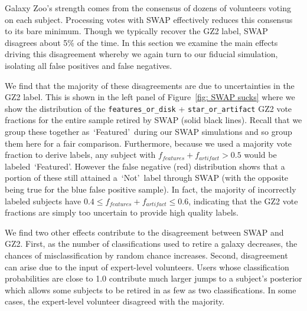 \documentclass[twocolumn]{aastex6}
\newcommand{\Pf}{$P_{F,0}$}
\newcommand{\Pn}{$P_{N,0}$}
\newcommand{\feat}{`Featured'}
\newcommand{\notfeat}{`Not'}
\newcommand{\raw}{GZ2$_{\text{raw}}$}
\begin{document}
Galaxy Zoo's strength comes from the consensus of dozens of volunteers voting on each subject. 
Processing votes with SWAP effectively reduces this consensus to its bare minimum. 
Though we typically recover the GZ2 label, SWAP disagrees about 5\% of the time. 
In this section we examine the main effects driving this disagreement whereby we again
 turn to our fiducial simulation, isolating all false positives and false negatives. 

We find that the majority of these disagreements are due to uncertainties in the GZ2
label. This is shown in the left panel of Figure~\ref{fig: SWAP sucks} where we show
the distribution of the \texttt{features\_or\_disk} + \texttt{star\_or\_artifact} GZ2 vote 
fractions for the entire sample retired by SWAP (solid black lines). 
Recall that we group these together as~\feat~during  our SWAP simulations and so 
group them here for a fair comparison. Furthermore, because we used a majority vote
fraction to derive labels, any subject with $ f_{features}+f_{artifact} > 0.5$ would be
labeled~\feat.  However the false negative (red) distribution shows that a portion 
of these still attained a~\notfeat~label through SWAP (with the opposite being 
true for the blue false positive sample). In fact, the majority of incorrectly labeled 
subjects have $0.4 \le f_{features}+f_{artifact} \le 0.6$,
indicating that the GZ2 vote fractions are simply too uncertain to provide high quality labels. 

We find two other effects contribute to the disagreement between SWAP and GZ2. First, as the number of classifications used to retire a galaxy decreases, the chances of misclassification by random chance increases. 
Second, disagreement can arise due to the input of expert-level volunteers. Users whose classification probabilities are close to 1.0 contribute much larger jumps to a subject's posterior which allows some subjects to be retired in as few as two classifications. In some cases, the expert-level volunteer disagreed with the majority. 

\end{document}
